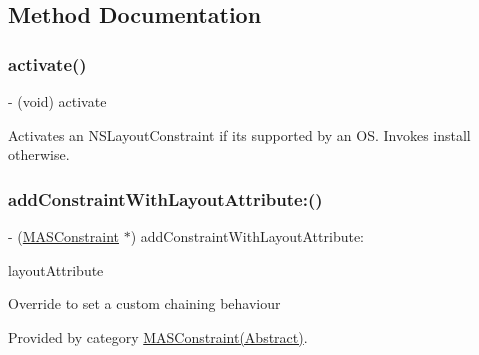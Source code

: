 \subsection{Method Documentation}
\mbox{\label{interface_m_a_s_constraint_adea708e41c18fdc753ceb5b0191bde5f}} 
\subsubsection{\texorpdfstring{activate()}{activate()}}
{\footnotesize\ttfamily -\/ (void) activate \begin{DoxyParamCaption}{ }\end{DoxyParamCaption}}

Activates an N\+S\+Layout\+Constraint if it\textquotesingle{}s supported by an OS. Invokes install otherwise. \mbox{\label{interface_m_a_s_constraint_a432981551ebd6025204a33e5e4676c97}} 
\subsubsection{\texorpdfstring{add\+Constraint\+With\+Layout\+Attribute\+:()}{addConstraintWithLayoutAttribute:()}}
{\footnotesize\ttfamily -\/ (\mbox{\hyperlink{interface_m_a_s_constraint}{M\+A\+S\+Constraint}} $\ast$) add\+Constraint\+With\+Layout\+Attribute\+: \begin{DoxyParamCaption}\item[{(N\+S\+Layout\+Attribute)}]{layout\+Attribute }\end{DoxyParamCaption}}

Override to set a custom chaining behaviour 

Provided by category \mbox{\hyperlink{category_m_a_s_constraint_07_abstract_08_a432981551ebd6025204a33e5e4676c97}{M\+A\+S\+Constraint(\+Abstract)}}.

\mbox{\label{interface_m_a_s_constraint_ac7ea96f1c2b71475b64bc82912a8e969}} 
